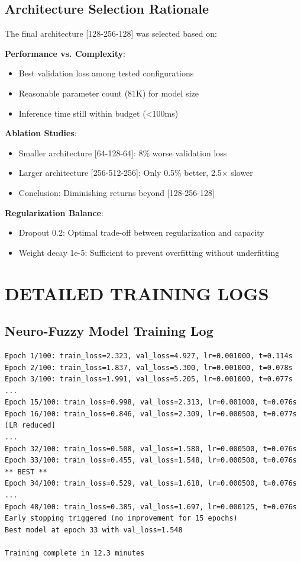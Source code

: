 \documentclass[12pt,a4paper]{report}
\begin{document}
\section{Architecture Selection Rationale}

The final architecture [128-256-128] was selected based on:

\textbf{Performance vs. Complexity}:
\begin{itemize}
    \item Best validation loss among tested configurations
    \item Reasonable parameter count (81K) for model size
    \item Inference time still within budget (<100ms)
\end{itemize}

\textbf{Ablation Studies}:
\begin{itemize}
    \item Smaller architecture [64-128-64]: 8\% worse validation loss
    \item Larger architecture [256-512-256]: Only 0.5\% better, 2.5$\times$ slower
    \item Conclusion: Diminishing returns beyond [128-256-128]
\end{itemize}

\textbf{Regularization Balance}:
\begin{itemize}
    \item Dropout 0.2: Optimal trade-off between regularization and capacity
    \item Weight decay 1e-5: Sufficient to prevent overfitting without underfitting
\end{itemize}

\chapter{DETAILED TRAINING LOGS}

\section{Neuro-Fuzzy Model Training Log}

{\footnotesize 
\begin{verbatim}
Epoch 1/100: train_loss=2.323, val_loss=4.927, lr=0.001000, t=0.114s
Epoch 2/100: train_loss=1.837, val_loss=5.300, lr=0.001000, t=0.078s
Epoch 3/100: train_loss=1.991, val_loss=5.205, lr=0.001000, t=0.077s
...
Epoch 15/100: train_loss=0.998, val_loss=2.313, lr=0.001000, t=0.076s
Epoch 16/100: train_loss=0.846, val_loss=2.309, lr=0.000500, t=0.077s [LR reduced]
...
Epoch 32/100: train_loss=0.508, val_loss=1.580, lr=0.000500, t=0.076s
Epoch 33/100: train_loss=0.455, val_loss=1.548, lr=0.000500, t=0.076s ** BEST **
Epoch 34/100: train_loss=0.529, val_loss=1.618, lr=0.000500, t=0.076s
...
Epoch 48/100: train_loss=0.385, val_loss=1.697, lr=0.000125, t=0.076s
Early stopping triggered (no improvement for 15 epochs)
Best model at epoch 33 with val_loss=1.548

Training complete in 12.3 minutes
\end{verbatim}}
\end{document}
